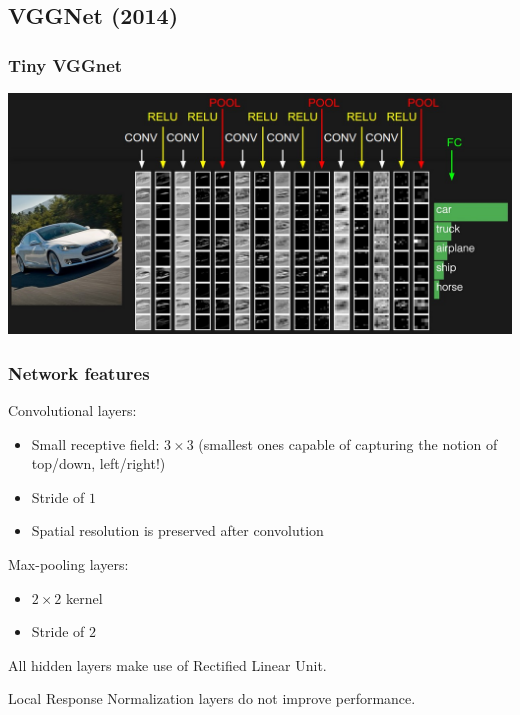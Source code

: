 \subsection{VGGNet (2014)}

\begin{frame}
	\frametitle{Tiny VGGnet}
	
		
		\bigskip 
		
	\begin{center}
		\includegraphics[scale=0.25]{figs/convnet}
	\end{center}
\end{frame}

\begin{frame}
	\frametitle{Network features}
	
	Convolutional layers:
	\begin{itemize}
		\item Small receptive field: $3 \times 3$ (smallest ones capable of capturing the notion of top/down, left/right!)
		\item Stride of $1$
		\item Spatial resolution is preserved after convolution
	\end{itemize} 
	
	\bigskip
	
	Max-pooling layers:
	\begin{itemize}
		\item $2 \times 2$ kernel
		\item Stride of $2$
	\end{itemize} 

	\bigskip
	
	All hidden layers make use of Rectified Linear Unit. 
	
	\bigskip
	
	Local Response Normalization layers do not improve performance. 
	 
\end{frame}

